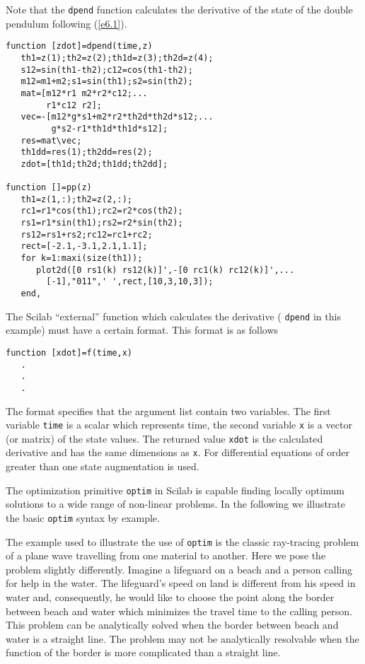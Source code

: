 

Note that the {\tt dpend} function calculates the derivative of
the state of the double pendulum following (\ref{e6.1}).

\begin{verbatim}
function [zdot]=dpend(time,z)
   th1=z(1);th2=z(2);th1d=z(3);th2d=z(4);
   s12=sin(th1-th2);c12=cos(th1-th2);
   m12=m1+m2;s1=sin(th1);s2=sin(th2);
   mat=[m12*r1 m2*r2*c12;...
        r1*c12 r2];
   vec=-[m12*g*s1+m2*r2*th2d*th2d*s12;...
         g*s2-r1*th1d*th1d*s12];
   res=mat\vec;
   th1dd=res(1);th2dd=res(2);
   zdot=[th1d;th2d;th1dd;th2dd];

function []=pp(z)
   th1=z(1,:);th2=z(2,:);
   rc1=r1*cos(th1);rc2=r2*cos(th2);
   rs1=r1*sin(th1);rs2=r2*sin(th2);
   rs12=rs1+rs2;rc12=rc1+rc2;
   rect=[-2.1,-3.1,2.1,1.1];
   for k=1:maxi(size(th1));
      plot2d([0 rs1(k) rs12(k)]',-[0 rc1(k) rc12(k)]',...
		[-1],"011",' ',rect,[10,3,10,3]);
   end,

\end{verbatim}

	The Scilab ``external'' function which calculates the derivative
( {\tt dpend} in this example) must have a certain format.
This format is as follows
\begin{verbatim}
function [xdot]=f(time,x)
   .
   .
   .
\end{verbatim}
The format specifies that the argument list contain two variables.
The first variable {\tt time} is a scalar which represents time, the second
variable {\tt x} is a vector (or matrix) of the state values.  The returned
value {\tt xdot} is the calculated derivative and has the same dimensions
as {\tt x}.  For differential equations of order greater than one
state augmentation is used. 

The optimization primitive 
{\tt optim} in Scilab
is capable finding locally optimum solutions to a wide range
of non-linear problems.  In the following we illustrate 
the basic {\tt optim} syntax by example. 

	The example used to illustrate the use of {\tt optim} is
the classic ray-tracing problem of a plane wave travelling from
one material to another.  Here we pose the problem slightly differently.
Imagine a lifeguard on a beach and a person calling for help 
in the water.  The lifeguard's speed on land is different from
his speed in water and, consequently, he would like to choose the
point along the border between beach and water which minimizes
the travel time to the calling person.  This problem can be analytically
solved when the border between beach and water is a straight
line.  The problem may not be analytically resolvable when the function
of the border is more complicated than a straight line.

